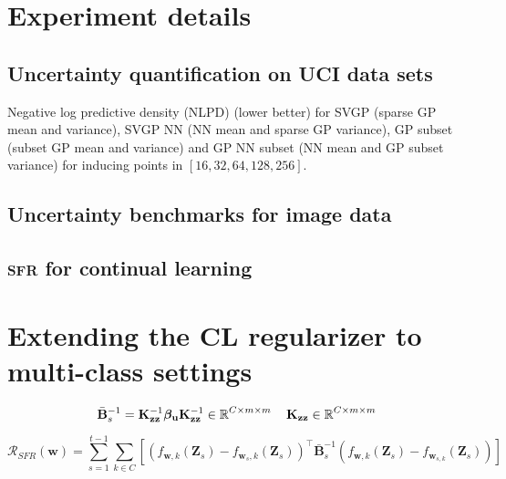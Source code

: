 \documentclass{article}
\newlength{\tblw}
\newcommand{\our}{\textsc{sfr}\xspace}
\newcommand{\mathbold}[1]{\bm{#1}}
\newcommand{\mbf}[1]{\mathbf{#1}}
\newcommand{\MB}{\mbf{B}}
\newcommand{\MZ}{\mbf{Z}}
\newcommand{\T}{\top}
\newcommand{\vbeta}[0]{\mathbold{\beta}}
\newcommand{\vu}{\mbf{u}}
\newcommand{\vw}{\mbf{w}}
\newcommand{\MKzz}{\mbf{K}_{\mbf{z}\mbf{z}}}
\begin{document}
\section{Experiment details}
\label{app:experiments}


\subsection{Uncertainty quantification on UCI data sets}
\label{app:uci}

\begin{table}[t!] 
  \centering\scriptsize
  \caption{Negative log predictive density (NLPD) (lower better) for SVGP (sparse GP mean and variance), SVGP NN (NN mean and sparse GP variance), GP subset (subset GP mean and variance) and GP NN subset (NN mean and GP subset variance) for inducing points in $[16, 32, 64, 128, 256]$. } 
	\label{tbl:uci}
	\renewcommand{\arraystretch}{1.}
	\setlength{\tabcolsep}{2pt}
	\setlength{\tblw}{0.14\textwidth}  
	
	\newcommand{\val}[2]{%
		$#1$\textcolor{gray}{\tiny ${\pm}#2$}
	} 

	
\end{table}


\subsection{Uncertainty benchmarks for image data}
\label{app:image}


\subsection{\our for continual learning}
\label{app:cl-exp}


\section{Extending the CL regularizer to multi-class settings}
\label{sec:cl_multioutput}
\begin{equation}
	\bar{\MB}^{-1}_s = \MKzz^{-1} \vbeta_\vu \MKzz^{-1} \in \R^{C \times m \times m} \quad \MKzz \in \R^{C \times m \times m} 
\end{equation}

\begin{equation}
	\mathcal{R_\textit{SFR}}(\mathbf{w}) = \sum_{s=1}^{t-1}	\sum_{k \in 	C}\left[\left(f_{\vw, k}(\MZ_{s}) - f_{\vw_{s}, k}(\MZ_s) \right)^\T \bar{\MB}^{-1}_{s} \left(f_{\vw, k}(\MZ_{s}) - f_{\vw_{s, k}}(\MZ_s) \right) \right] 
\end{equation}
\end{document}
